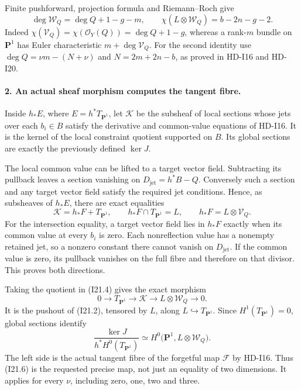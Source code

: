 Finite pushforward, projection formula and Riemann--Roch give
\begin{equation}
 \deg\mathcal W_Q=\deg Q+1-g-m,\qquad
 \chi(L\otimes\mathcal W_Q)=b-2n-g-2.                 \tag{I21.3}
\end{equation}
Indeed $\chi(\mathcal V_Q)=\chi(\mathcal O_Y(Q))=
\deg Q+1-g$, whereas a rank-$m$ bundle on $\mathbf P^1$ has
Euler characteristic $m+\deg\mathcal V_Q$. For the second
identity use $\deg Q=\nu m-(N+\nu)$ and
$N=2m+2n-b$, as proved in HD-I16 and HD-I20.

\paragraph{2. An actual sheaf morphism computes the tangent fibre.}
Inside $h_*E$, where $E=h^*T_{\mathbf P^1}$, let $\mathcal K$
be the subsheaf of local sections whose jets over each $b_i\in B$
satisfy the derivative and common-value equations of HD-I16.
It is the kernel of the local constraint quotient supported on
$B$. Its global sections are exactly the previously defined
$\ker J$.

The local common value can be lifted to a target vector field.
Subtracting its pullback leaves a section vanishing on
$D_{\mathrm{jet}}=h^*B-Q$. Conversely such a section and any
target vector field satisfy the required jet conditions. Hence,
as subsheaves of $h_*E$, there are exact equalities
\begin{equation}
 \mathcal K=h_*F+T_{\mathbf P^1},\qquad
 h_*F\cap T_{\mathbf P^1}=L,
 \qquad h_*F=L\otimes\mathcal V_Q.                   \tag{I21.4}
\end{equation}
For the intersection equality, a target vector field lies in
$h_*F$ exactly when its common value at every $b_i$ is zero.
Each nonreflection value has a nonempty retained jet, so a
nonzero constant there cannot vanish on $D_{\mathrm{jet}}$.
If the common value is zero, its pullback vanishes on the full
fibre and therefore on that divisor. This proves both directions.

Taking the quotient in (I21.4) gives the exact morphism
\begin{equation}
 0\longrightarrow T_{\mathbf P^1}\longrightarrow\mathcal K
       \longrightarrow L\otimes\mathcal W_Q
       \longrightarrow0.                             \tag{I21.5}
\end{equation}
It is the pushout of (I21.2), tensored by $L$, along
$L\hookrightarrow T_{\mathbf P^1}$. Since
$H^1(T_{\mathbf P^1})=0$, global sections identify
\begin{equation}
 \frac{\ker J}{h^*H^0(T_{\mathbf P^1})}
       \simeq H^0\bigl(\mathbf P^1,L\otimes\mathcal W_Q\bigr).
                                                        \tag{I21.6}
\end{equation}
The left side is the actual tangent fibre of the forgetful map
$\mathcal F$ by HD-I16. Thus (I21.6) is the requested precise
map, not just an equality of two dimensions. It applies for
every $\nu$, including zero, one, two and three.

